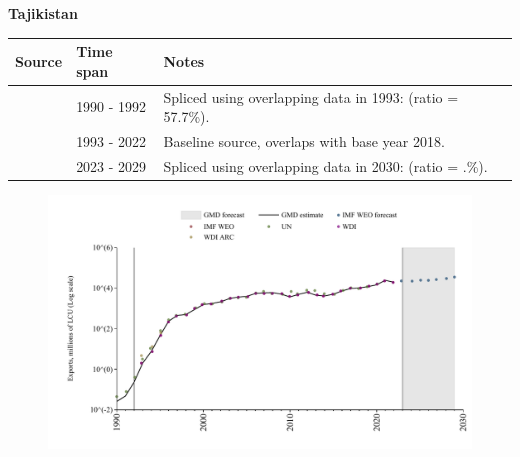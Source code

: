 \documentclass[12pt,a4paper,landscape]{article}
\begin{document}
\begin{adjustbox}{max totalsize={\paperwidth}{\paperheight},center}
\begin{minipage}[t][\textheight][t]{\textwidth}
\vspace*{0.5cm}
{}
\begin{center}
{\Large\bfseries Tajikistan}
\end{center}
\vspace{0.5cm}
\begin{table}[H]
\centering
\small
\begin{tabular}{|l|l|l|}
\hline
\textbf{Source} & \textbf{Time span} & \textbf{Notes} \\
\hline
\rowcolor{white}\cite{UN}& 1990 - 1992 &Spliced using overlapping data in 1993: (ratio = 57.7\%).\\
\rowcolor{lightgray}\cite{WDI}& 1993 - 2022 &Baseline source, overlaps with base year 2018.\\
\rowcolor{white}\cite{IMF_WEO_forecast}& 2023 - 2029 &Spliced using overlapping data in 2030: (ratio = .\%).\\
\hline
\end{tabular}
\end{table}
\begin{figure}[H]
\centering
\includegraphics[width=\textwidth,height=0.6\textheight,keepaspectratio]{graphs/TJK_exports.pdf}
\end{figure}
\end{minipage}
\end{adjustbox}
\end{document}
